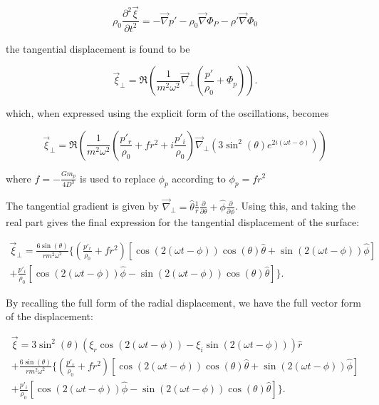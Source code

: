 \documentclass[11pt]{amsart}
\begin{document}
\begin{equation} \label{eq:mom_lin}
\rho_{0} \frac{\partial^{2} \vec{\xi}}{\partial t^{2}} = - \vec{\nabla} p' - \rho_{0} \vec{\nabla} \Phi_{P}
- \rho' \vec{\nabla} \Phi_{0}
\end{equation}

the tangential displacement is found to be

\begin{equation}
\vec{\xi}_{\perp} = \Re \left(   \frac{1}{m^{2} \omega^{2}}  \vec{\nabla}_{\perp}  \left(   \frac{p'}{\rho_{0}}  +  \Phi_{p}   \right) \right).
\end{equation}

which, when expressed using the explicit form of the oscillations, becomes

\begin{equation}
\vec{\xi}_{\perp} = \Re \left(   \frac{1}{m^{2} \omega^{2}}  \left(   \frac{p'_{r}}{\rho_{0}}  +  f r^{2} + i \frac{p'_{i}}{\rho_{0}}   \right)   \vec{\nabla}_{\perp}  \left(   3 \sin^{2}(\theta) e^{2 i ( \omega t - \phi)}   \right)  \right)
\end{equation}

where $f = - \frac{G m_{p}}{4 D^{3}}$ is used to replace $\phi_{p}$ according to $\phi_{p} = f r^{2}$

The tangential gradient is given by $\vec{\nabla}_{\perp} = \hat{\theta} \frac{1}{r} \frac{\partial}{\partial \theta} + \hat{\phi} \frac{\partial}{\partial \phi}$.  Using this, and taking the real part gives the final expression for the tangential displacement of the surface:

\begin{multline}
\vec{\xi}_{\perp} =    \frac{6 \sin(\theta)}{r m^{2} \omega^{2}}  \Bigg\{  \left(   \frac{p'_{r}}{\rho_{0}}  +  f r^{2} \right) \left[ \cos(2( \omega t - \phi )) \cos(\theta) \hat{\theta}  +  \sin(2( \omega t - \phi )) \hat{\phi} \right] \\
 + \frac{p'_{i}}{\rho_{0}}  \left[ \cos(2( \omega t - \phi )) \hat{\phi}  -  \sin(2( \omega t - \phi )) \cos(\theta) \hat{\theta} \right]    \Bigg\}.
\end{multline}

By recalling the full form of the radial displacement, we have the full vector form of the displacement:

\begin{multline}
\vec{\xi} =    3 \sin^{2}(\theta) \left(  \xi_{r} \cos \left( 2 ( \omega t - \phi) \right)  - \xi_{i} \sin \left( 2 ( \omega t - \phi) \right) \right) \hat{r} \\
+ \frac{6 \sin(\theta)}{r m^{2} \omega^{2}}  \Bigg\{  \left(   \frac{p'_{r}}{\rho_{0}}  +  f r^{2} \right) \left[ \cos(2( \omega t - \phi )) \cos(\theta) \hat{\theta}  +  \sin(2( \omega t - \phi )) \hat{\phi} \right] \\
 + \frac{p'_{i}}{\rho_{0}}  \left[ \cos(2( \omega t - \phi )) \hat{\phi}  -  \sin(2( \omega t - \phi )) \cos(\theta) \hat{\theta} \right]    \Bigg\}.
\end{multline}
\end{document}
